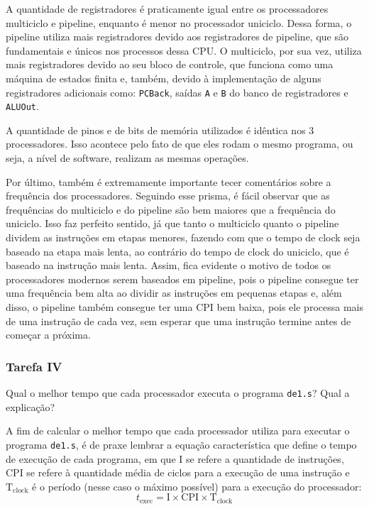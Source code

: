 \documentclass[a4paper,12pt]{article}
\newcommand{\cod}[1]{\texttt{#1}}
\begin{document}
A quantidade de registradores é praticamente igual entre os processadores multiciclo e pipeline, enquanto é menor no processador uniciclo. Dessa forma, o pipeline utiliza mais registradores devido aos registradores de pipeline, que são fundamentais e únicos nos processos dessa CPU. O multiciclo, por sua vez, utiliza mais registradores devido ao seu bloco de controle, que funciona como uma máquina de estados finita e, também, devido à implementação de alguns registradores adicionais como: \cod{PCBack}, saídas \cod{A} e \cod{B} do banco de registradores e \cod{ALUOut}.

A quantidade de pinos e de bits de memória utilizados é idêntica nos 3 processadores. Isso acontece pelo fato de que eles rodam o mesmo programa, ou seja, a nível de software, realizam as mesmas operações.

Por último, também é extremamente importante tecer comentários sobre a frequência dos processadores. Seguindo esse prisma, é fácil observar que as frequências do multiciclo e do pipeline são bem maiores que a frequência do uniciclo. Isso faz perfeito sentido, já que tanto o multiciclo quanto o pipeline dividem as instruções em etapas menores, fazendo com que o tempo de clock seja baseado na etapa mais lenta, ao contrário do tempo de clock do uniciclo, que é baseado na instrução mais lenta. Assim, fica evidente o motivo de todos os processadores modernos serem baseados em pipeline, pois o pipeline consegue ter uma frequência bem alta ao dividir as instruções em pequenas etapas e, além disso, o pipeline também consegue ter uma CPI bem baixa, pois ele processa mais de uma instrução de cada vez, sem esperar que uma instrução termine antes de começar a próxima.



\subsubsection{Tarefa IV}
\begin{tcolorbox}[title=Enunciado, colback=blue!5!white, colframe=blue!75!black]
    Qual o melhor tempo que cada processador executa o programa \cod{de1.s}? Qual a explicação? 
\end{tcolorbox}

A fim de calcular o melhor tempo que cada processador utiliza para executar o programa \cod{de1.s}, é de praxe lembrar a equação característica que define o tempo de execução de cada programa, em que $\mathrm{I}$ se refere a quantidade de instruções, CPI se refere à quantidade média de ciclos para a execução de uma instrução e $\mathrm{T}_{\mathrm{clock}}$ é o período (nesse caso o máximo possível) para a execução do processador:
\begin{equation*}
    t_{\mathrm{exec}} = \mathrm{I} \times \mathrm{CPI} \times \mathrm{T}_{\mathrm{clock}}
\end{equation*}
\end{document}
